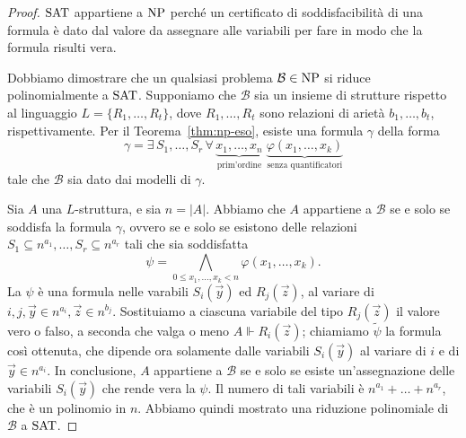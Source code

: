 \begin{proof}
  $\operatorname{SAT}$ appartiene a $\operatorname{NP}$ perché un certificato di soddisfacibilità di una formula è dato dal valore da assegnare alle variabili per fare in modo che la formula risulti vera.
  
  Dobbiamo dimostrare che un qualsiasi problema $\mathcal{B}\in\operatorname{NP}$ si riduce polinomialmente a $\operatorname{SAT}$.
  Supponiamo che $\mathcal{B}$ sia un insieme di strutture rispetto al linguaggio $L=\{R_1,\dots,R_t\}$, dove $R_1,\dots,R_t$ sono relazioni di arietà $b_1,\dots,b_t$, rispettivamente.
  Per il Teorema~\ref{thm:np-eso}, esiste una formula $\gamma$ della forma
  \[ \gamma = \exists\, S_1,\dots,S_r \, \forall\, \underbrace{x_1,\dots,x_n}_{\text{prim'ordine}} \; \underbrace{\varphi(x_1,\dots,x_k)}_{\text{senza quantificatori}} \]
  tale che $\mathcal{B}$ sia dato dai modelli di $\gamma$.
  
  Sia $A$ una $L$-struttura, e sia $n=|A|$. Abbiamo che $A$ appartiene a $\mathcal{B}$ se e solo se soddisfa la formula $\gamma$, ovvero se e solo se esistono delle relazioni $S_1\subseteq n^{a_1}, \dots, S_r\subseteq n^{a_r}$ tali che sia soddisfatta
  \[ \psi = \bigwedge_{0\leq x_1,\dots,x_k < n} \varphi(x_1,\dots,x_k). \]
  La $\psi$ è una formula nelle varabili $S_i(\vec{y})$ ed $R_j(\vec{z})$, al variare di $i,j,\vec{y}\in n^{a_i}, \vec{z}\in n^{b_j}$.
  Sostituiamo a ciascuna variabile del tipo $R_j(\vec{z})$ il valore vero o falso, a seconda che valga o meno $A\Vdash R_i(\vec{z})$; chiamiamo $\tilde\psi$ la formula così ottenuta, che dipende ora solamente dalle variabili $S_i(\vec{y})$ al variare di $i$ e di $\vec{y}\in n^{a_i}$.
  In conclusione, $A$ appartiene a $\mathcal{B}$ se e solo se esiste un'assegnazione delle variabili $S_i(\vec{y})$ che rende vera la $\psi$. Il numero di tali variabili è $n^{a_1}+\ldots+n^{a_r}$, che è un polinomio in $n$.
  Abbiamo quindi mostrato una riduzione polinomiale di $\mathcal{B}$ a $\operatorname{SAT}$.
\end{proof}




